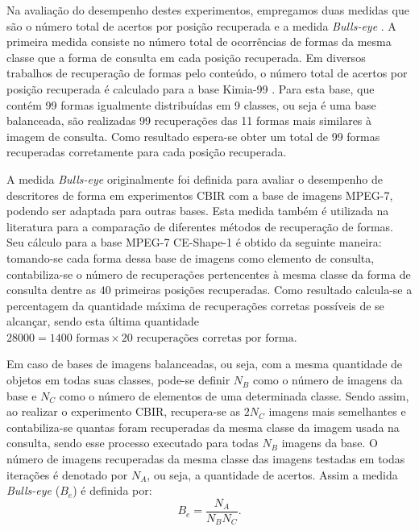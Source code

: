 Na avaliação do desempenho destes experimentos, empregamos duas medidas que são  o número total de acertos por posição recuperada e a medida \textit{Bulls-eye} \cite{Ling:2007:SCU:1191552.1191806,Latecki2000}.
A primeira medida consiste no número total de ocorrências de formas da mesma classe que a forma de consulta em cada posição recuperada.  Em diversos trabalhos de recuperação de formas pelo conteúdo, o número total de acertos por posição recuperada é calculado para a base Kimia-99 \cite{Bernier:2003}. Para esta base, que contém 99 formas igualmente distribuídas em 9 classes, ou seja é uma base balanceada, são realizadas 99 recuperações das 11 formas mais similares à imagem de consulta. Como resultado espera-se obter um total de 99 formas recuperadas corretamente para cada posição recuperada.

A medida  \textit{Bulls-eye} \cite{Latecki2000} originalmente foi definida para avaliar o desempenho de descritores de forma em experimentos \ac{CBIR} com a base de imagens MPEG-7, podendo ser adaptada para outras bases. Esta medida também é utilizada na literatura para a comparação de diferentes métodos de recuperação de formas. Seu cálculo  para a base MPEG-7 CE-Shape-1 é obtido da seguinte maneira: tomando-se cada forma dessa base de imagens como elemento de consulta, contabiliza-se o número de recuperações pertencentes à mesma classe da forma de consulta dentre as $40$ primeiras posições recuperadas. Como resultado calcula-se a percentagem da quantidade máxima de recuperações corretas possíveis de se alcançar, sendo esta última quantidade $28000 = 1400\text{ formas} \times 20\text{ recuperações corretas por forma}$.


%

Em caso de bases de imagens balanceadas, ou seja, com a mesma quantidade de objetos em todas suas classes, pode-se definir $N_B$ como o número de imagens da base e $N_C$ como o número de elementos de uma determinada classe. Sendo assim, ao realizar o experimento \ac{CBIR}, recupera-se as $2N_C$ imagens mais semelhantes e contabiliza-se quantas foram recuperadas da mesma classe da imagem usada na consulta, sendo esse processo executado para todas $N_B$ imagens da base. O número de imagens recuperadas da mesma classe das imagens testadas em todas iterações é denotado por $N_A$, ou seja, a quantidade de acertos.
Assim a medida \textit{Bulls-eye} ($B_e$) é definida por: %
\begin{equation} 
\label{eq:Bulls-eye}
B_e=\frac{N_A}{N_B N_C}.
\end{equation}

